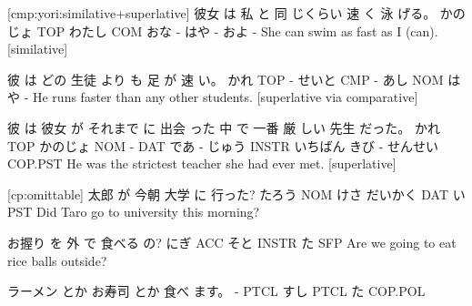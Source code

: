 [cmp:yori:similative+superlative]
彼女     は   私    と 同 じくらい 速  く 泳 げる。
かのじょ TOP わたし COM おな -    はや - およ -
She can swim as fast as I (can). [similative]

彼   は どの 生徒 より も 足   が  速 い。
かれ TOP - せいと CMP - あし NOM はや -
He runs faster than any other students. [superlative via comparative]

彼   は   彼女    が それまで に 出会 った 中    で   一番    厳 しい 先生    だった。
かれ TOP かのじょ NOM -     DAT であ - じゅう INSTR いちばん きび - せんせい COP.PST
He was the strictest teacher she had ever met. [superlative]

[cp:omittable]
太郎   が  今朝 大学    に   行った?
たろう NOM けさ だいかく DAT い PST
Did Taro go to university this morning?

お握り を   外  で      食べる の?
にぎ  ACC そと INSTR  た SFP
Are we going to eat rice balls outside?

ラーメン とか お寿司 とか 食べ ます。
-      PTCL すし  PTCL た COP.POL
